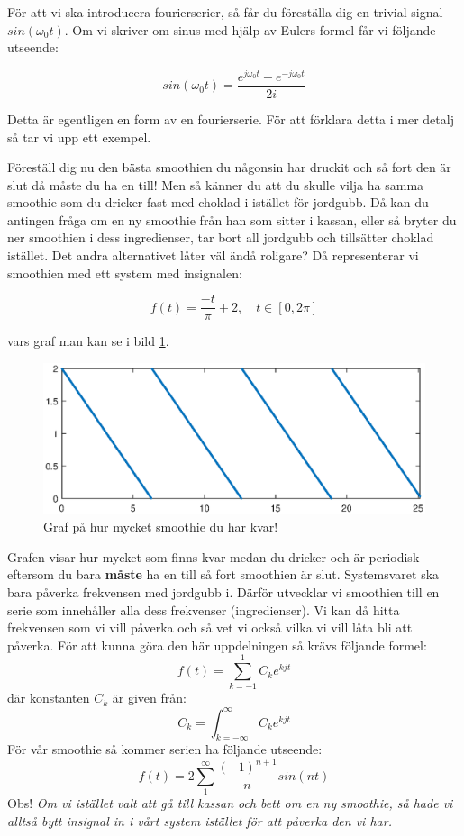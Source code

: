 \documentclass{article}
\begin{document}
För att vi ska introducera fourierserier, så får du föreställa dig en
trivial signal $sin(\omega_0 t)$.
Om vi skriver om sinus med hjälp av Eulers formel får vi följande utseende:

$$sin(\omega_0 t) = \frac{e^{j \omega_0 t}  - e^{-j \omega_0 t}}{2i}$$

Detta är egentligen en form av en fourierserie.
För att förklara detta i mer detalj så tar vi upp ett exempel.

Föreställ dig nu den bästa smoothien du någonsin har druckit och så fort den är
slut då måste du ha en till! Men så känner du att du skulle vilja ha samma
smoothie som du dricker fast med choklad i istället för jordgubb.
Då kan du antingen fråga om en ny smoothie från han som sitter i kassan,
eller så bryter du ner smoothien i dess ingredienser, tar bort all jordgubb
och tillsätter choklad istället. Det andra alternativet låter väl ändå roligare?
Då representerar vi smoothien med ett system med insignalen:

$$f(t) = \frac{-t}{\pi} + 2, \quad t \in [0,2 \pi] $$

vars graf man kan se i bild \ref{fig:smoothie}.

\begin{figure}[ht]
\centerline{\includegraphics[scale=0.55]{smoothie.eps}}
\caption{Graf på hur mycket smoothie du har kvar!}
\label{fig:smoothie}
\end{figure}

Grafen visar hur mycket som finns kvar medan du dricker och är periodisk
eftersom du bara \textbf{måste} ha en till så fort smoothien är slut.
Systemsvaret ska bara påverka frekvensen med jordgubb i.
Därför utvecklar vi smoothien till en serie som innehåller alla dess
frekvenser (ingredienser). Vi kan då hitta frekvensen som vi vill påverka och
så vet vi också vilka vi vill låta bli att påverka.
För att kunna göra den här uppdelningen så krävs följande formel:
$$f(t) = \sum_{k=-1}^1 C_k e^{k j t}$$
där konstanten $C_k$ är given från:
$$C_k = \int_{k=-\infty}^{\infty} C_k e^{k j t}$$
För vår smoothie så kommer serien ha följande utseende:
$$f(t) = 2 \sum_{1}^{\infty} \frac{(-1)^{n+1}}{n} sin(n t)$$
Obs! \emph{Om vi istället valt att gå till kassan och bett om en ny smoothie,
  så hade vi alltså bytt insignal in i vårt system istället för att påverka den vi har.}
\end{document}
